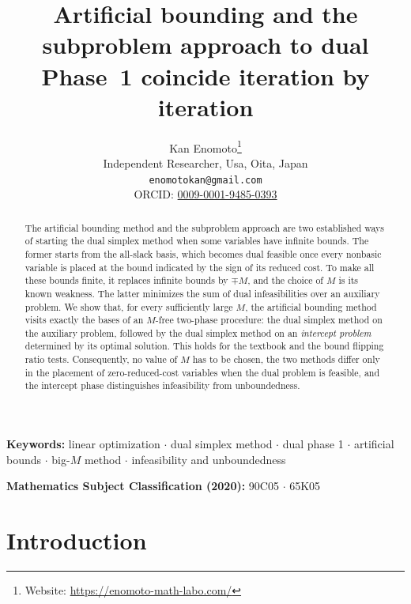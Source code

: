 \documentclass[11pt,a4paper]{article}
\title{Artificial bounding and the subproblem approach to dual Phase~1 coincide iteration by iteration}
\author{Kan Enomoto\thanks{Website: \url{https://enomoto-math-labo.com/}}\\
Independent Researcher, Usa, Oita, Japan\\
\texttt{enomotokan@gmail.com}\\
ORCID: \href{https://orcid.org/0009-0001-9485-0393}{0009-0001-9485-0393}}
\date{}
\theoremstyle{plain}
\theoremstyle{definition}
\theoremstyle{remark}
\begin{document}
\maketitle
\begin{abstract}
The artificial bounding method and the subproblem approach are two established ways of starting the dual simplex method when some variables have infinite bounds. The former starts from the all-slack basis, which becomes dual feasible once every nonbasic variable is placed at the bound indicated by the sign of its reduced cost. To make all these bounds finite, it replaces infinite bounds by $\mp M$, and the choice of $M$ is its known weakness. The latter minimizes the sum of dual infeasibilities over an auxiliary problem. We show that, for every sufficiently large $M$, the artificial bounding method visits exactly the bases of an $M$-free two-phase procedure: the dual simplex method on the auxiliary problem, followed by the dual simplex method on an \emph{intercept problem} determined by its optimal solution. This holds for the textbook and the bound flipping ratio tests. Consequently, no value of $M$ has to be chosen, the two methods differ only in the placement of zero-reduced-cost variables when the dual problem is feasible, and the intercept phase distinguishes infeasibility from unboundedness.
\end{abstract}

\noindent\textbf{Keywords:} linear optimization $\cdot$ dual simplex method $\cdot$ dual phase 1 $\cdot$ artificial bounds $\cdot$ big-$M$ method $\cdot$ infeasibility and unboundedness

\medskip
\noindent\textbf{Mathematics Subject Classification (2020):} 90C05 $\cdot$ 65K05
\section{Introduction}
\label{sec:intro}
\end{document}
